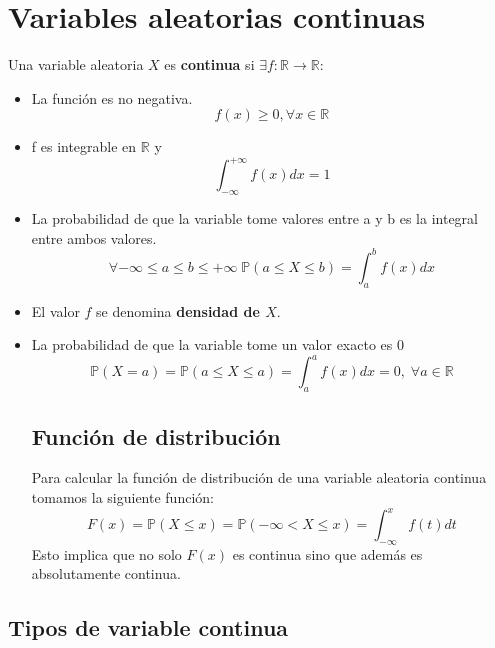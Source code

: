 \documentclass[11pt]{article}
\newcommand{\R}{\mathbb{R}}
\newcommand{\prob}{\mathbb{P}}
\theoremstyle{plain}
\begin{document}
    \section{Variables aleatorias continuas} %
    \label{sec:variables_aleatorias_continuas}
        Una variable aleatoria $X$ es \textbf{continua} si $\exists f:\R\rightarrow\R$:
        \begin{itemize}
            \item La función es no negativa.
            \[f(x) \ge 0, \forall x \in \R\]
            \item f es integrable en $\R$ y \[\int_{-\infty}^{+\infty} f(x) dx = 1\]
            \item La probabilidad de que la variable tome valores entre a y b es la integral entre ambos valores.\[\forall -\infty \le a \le b \le +\infty\; \prob(a\le X\le b) = \int_{a}^b f(x) dx\]
            \item El valor $f$ se denomina \textbf{densidad de $X$}.
            \item La probabilidad de que la variable tome un valor exacto es $0$
            \[\prob(X=a) = \prob(a \le X \le a) = \int_{a}^a f(x) dx= 0, \; \forall a\in\R\]
            \subsection{Función de distribución} %
            \label{sub:función_de_distribución}
                Para calcular la función de distribución de una variable aleatoria continua tomamos la siguiente función:
                \[F(x) = \prob(X\le x)= \prob(-\infty < X \le x) = \int_{-\infty}^x f(t) dt\]
                Esto implica que no solo $F(x)$ es continua sino que además es absolutamente continua.
        \end{itemize}
            \subsection{Tipos de variable continua} %
            \label{sub:tipos_de_variable_continua}   
\end{document}
